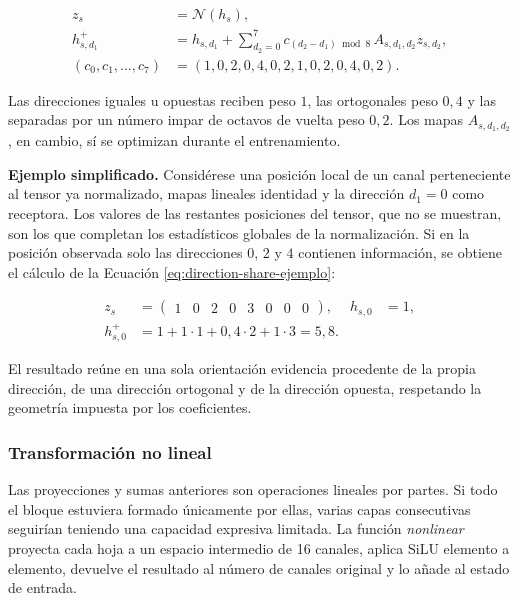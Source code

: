 \documentclass[11pt,a4paper,spanish]{book}
\numberwithin{equation}{chapter}
\numberwithin{figure}{chapter}
\begin{document}
\begin{equation}\label{eq:direction-share-operacion}
\begin{aligned}
z_s&=\mathcal{N}(h_s),\\
h_{s,d_1}^{+}
 &=h_{s,d_1}
   +\sum_{d_2=0}^{7}
    c_{(d_2-d_1)\bmod 8}\,
    A_{s,d_1,d_2}z_{s,d_2},\\
(c_0,c_1,\ldots,c_7)
 &=\left(1,0{,}2,0{,}4,0{,}2,1,0{,}2,0{,}4,0{,}2\right).
\end{aligned}
\end{equation}

Las direcciones iguales u opuestas reciben peso \(1\), las ortogonales peso \(0{,}4\) y las separadas por un número impar de octavos
de vuelta peso \(0{,}2\). Los mapas \(A_{s,d_1,d_2}\), en cambio, sí se optimizan durante el entrenamiento.

\textbf{Ejemplo simplificado.} Considérese una posición local de un canal perteneciente al tensor ya normalizado, mapas lineales
identidad y la dirección \(d_1=0\) como receptora. Los valores de las restantes posiciones del tensor, que no se muestran, son los que
completan los estadísticos globales de la normalización. Si en la posición observada solo las direcciones \(0\), \(2\) y \(4\)
contienen información, se obtiene el cálculo de la Ecuación \eqref{eq:direction-share-ejemplo}:

\begin{equation}\label{eq:direction-share-ejemplo}
\begin{aligned}
z_s&=\begin{pmatrix}1&0&2&0&3&0&0&0\end{pmatrix},
& h_{s,0}&=1,\\
h_{s,0}^{+}
 &=1+1\cdot1+0{,}4\cdot2+1\cdot3
 =5{,}8.
\end{aligned}
\end{equation}

El resultado reúne en una sola orientación evidencia procedente de la propia dirección, de una dirección ortogonal y de la dirección
opuesta, respetando la geometría impuesta por los coeficientes.

\subsubsection{Transformación no lineal}

Las proyecciones y sumas anteriores son operaciones lineales por partes. Si todo el bloque estuviera formado únicamente por ellas,
varias capas consecutivas seguirían teniendo una capacidad expresiva limitada. La función \textit{nonlinear} proyecta cada hoja a un
espacio intermedio de 16 canales, aplica SiLU elemento a elemento, devuelve el resultado al número de canales original y lo añade al
estado de entrada.
\end{document}
